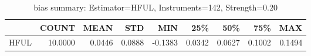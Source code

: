 \begin{table}[ht]
\centering
\caption{bias summary: Estimator=HFUL, Instruments=142, Strength=0.20}
\begin{tabular}{lrrrrrrrr}
\toprule
 & COUNT & MEAN & STD & MIN & 25\% & 50\% & 75\% & MAX \\
\midrule
HFUL & 10.0000 & 0.0446 & 0.0888 & -0.1383 & 0.0342 & 0.0627 & 0.1002 & 0.1494 \\
\bottomrule
\end{tabular}
\end{table}
